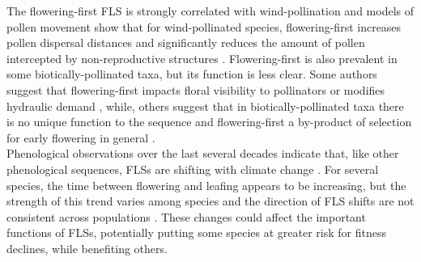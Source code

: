 \documentclass[12pt]{article}\usepackage[]{graphicx}\usepackage[]{color}
\begin{document}
\noindent The flowering-first FLS is strongly correlated with wind-pollination \citep{Buonaiuto2020, Friedman2009} and models of pollen movement show that for wind-pollinated species, flowering-first increases pollen dispersal distances and significantly reduces the amount of pollen intercepted by non-reproductive structures \citep{Di-Giovanni:1989aa,Tauber1967,Whitehead1969}. Flowering-first is also prevalent in some biotically-pollinated taxa, but its function is less clear. Some authors suggest that flowering-first impacts floral visibility to pollinators \citep{Janzen1967, Bukovac:2017aa,Forrest:2009aa} or modifies hydraulic demand \citep{Gougherty2018,Franklin2016}, while, others suggest that in biotically-pollinated taxa there is no unique function to the sequence and flowering-first a by-product of selection for early flowering in general \citep{Primack1987}.\\ 

\noindent Phenological observations over the last several decades indicate that, like other phenological sequences, FLSs are shifting with climate change \citep{Ma2020:aa}. For several species, the time between flowering and leafing appears to be increasing, but the strength of this trend varies among species and the direction of FLS shifts are not consistent across populations \citep{Buonaiuto2020,Ma2020:aa}. These changes could affect the important functions of FLSs, potentially putting some species at greater risk for fitness declines, while benefiting others.\\


\end{document}
